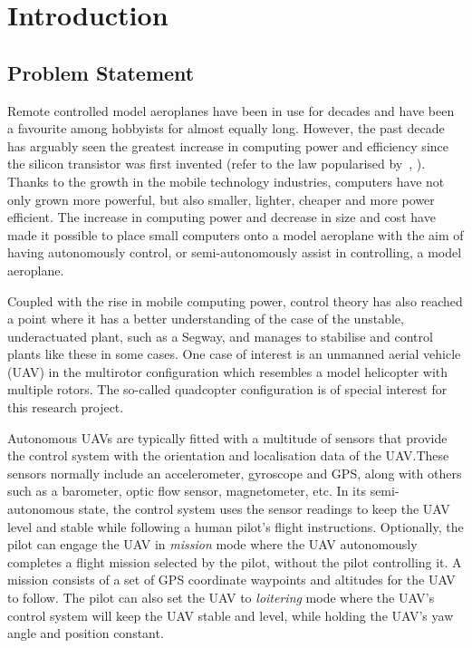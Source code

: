 \chapter{Introduction}
\label{chap1}

\section{Problem Statement}
\label{sec:problem-statement}

Remote controlled model aeroplanes have been in use for decades and have been a favourite among hobbyists for almost equally long. However, the past decade has arguably seen the greatest increase in computing power and efficiency since the silicon transistor was first invented (refer to the law popularised by~\citeauthor{moore2005cramming}, \citeyear{moore2005cramming}). Thanks to the growth in the mobile technology industries, computers have not only grown more powerful, but also smaller, lighter, cheaper and more power efficient. The increase in computing power and decrease in size and cost have made it possible to place small computers onto a model aeroplane with the aim of having autonomously control, or semi-autonomously assist in controlling, a model aeroplane. 

Coupled with the rise in mobile computing power, control theory has also reached a point where it has a better understanding of the case of the unstable, underactuated plant, such as a Segway, and manages to stabilise and control plants like these in some cases. One case of interest is an unmanned aerial vehicle (UAV) in the multirotor configuration which resembles a model helicopter with multiple rotors. The so-called quadcopter configuration is of special interest for this research project.  

Autonomous UAVs are typically fitted with a multitude of sensors that provide the control system with the orientation and localisation data of the UAV.\@ These sensors normally include an accelerometer, gyroscope and GPS, along with others such as a barometer, optic flow sensor, magnetometer, etc. In its semi-autonomous state, the control system uses the sensor readings to keep the UAV level and stable while following a human pilot's flight instructions. Optionally, the pilot can engage the UAV in \emph{mission} mode where the UAV autonomously completes a flight mission selected by the pilot, without the pilot controlling it. A mission consists of a set of GPS coordinate waypoints and altitudes for the UAV to follow. The pilot can also set the UAV to \emph{loitering} mode where the UAV's control system will keep the UAV stable and level, while holding the UAV's yaw angle and position constant. 

